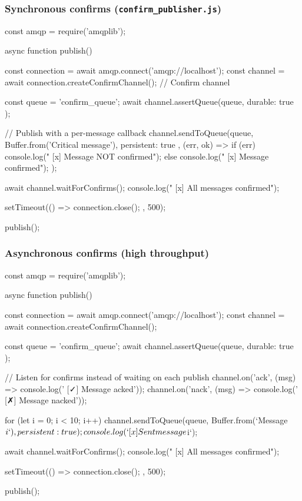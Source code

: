 \documentclass[11pt,a4paper]{article}
\begin{document}
\subsubsection*{Synchronous confirms (\texttt{confirm\_publisher.js})}
\begin{js}[basicstyle=\ttfamily\scriptsize]
const amqp = require('amqplib');

async function publish() {
    const connection = await amqp.connect('amqp://localhost');
    const channel = await connection.createConfirmChannel();  // Confirm channel

    const queue = 'confirm_queue';
    await channel.assertQueue(queue, { durable: true });

    // Publish with a per-message callback
    channel.sendToQueue(queue, Buffer.from('Critical message'), { persistent: true },
        (err, ok) => {
            if (err) {
                console.log(" [x] Message NOT confirmed");
            } else {
                console.log(" [x] Message confirmed");
            }
        });

    await channel.waitForConfirms();
    console.log(" [x] All messages confirmed");

    setTimeout(() => { connection.close(); }, 500);
}
publish();
\end{js}

\subsubsection*{Asynchronous confirms (high throughput)}
\begin{js}[basicstyle=\ttfamily\scriptsize]
const amqp = require('amqplib');

async function publish() {
    const connection = await amqp.connect('amqp://localhost');
    const channel = await connection.createConfirmChannel();

    const queue = 'confirm_queue';
    await channel.assertQueue(queue, { durable: true });

    // Listen for confirms instead of waiting on each publish
    channel.on('ack', (msg) => console.log(' [✓] Message acked'));
    channel.on('nack', (msg) => console.log(' [✗] Message nacked'));

    for (let i = 0; i < 10; i++) {
        channel.sendToQueue(queue, Buffer.from(`Message ${i}`), { persistent: true });
        console.log(` [x] Sent message ${i}`);
    }

    await channel.waitForConfirms();
    console.log(" [x] All messages confirmed");

    setTimeout(() => { connection.close(); }, 500);
}
publish();
\end{js}
\end{document}
